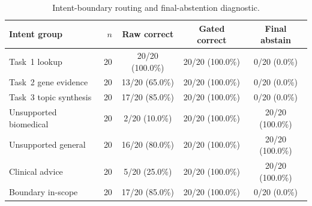 \begin{table}
\centering
\scriptsize
\caption{Intent-boundary routing and final-abstention diagnostic.}
\label{tab:intent-boundary-diagnostic}
\setlength{\tabcolsep}{4pt}
\renewcommand{\arraystretch}{1.05}
\begin{tabular}{l r c c c}
\toprule
\textbf{Intent group} & \textbf{$n$} & \textbf{Raw correct} & \textbf{Gated correct} & \textbf{Final abstain} \\
\midrule
Task~1 lookup & 20 & 20/20 (100.0\%) & 20/20 (100.0\%) & 0/20 (0.0\%) \\
Task~2 gene evidence & 20 & 13/20 (65.0\%) & 20/20 (100.0\%) & 0/20 (0.0\%) \\
Task~3 topic synthesis & 20 & 17/20 (85.0\%) & 20/20 (100.0\%) & 0/20 (0.0\%) \\
Unsupported biomedical & 20 & 2/20 (10.0\%) & 20/20 (100.0\%) & 20/20 (100.0\%) \\
Unsupported general & 20 & 16/20 (80.0\%) & 20/20 (100.0\%) & 20/20 (100.0\%) \\
Clinical advice & 20 & 5/20 (25.0\%) & 20/20 (100.0\%) & 20/20 (100.0\%) \\
Boundary in-scope & 20 & 17/20 (85.0\%) & 20/20 (100.0\%) & 0/20 (0.0\%) \\
\bottomrule
\end{tabular}
\end{table}
